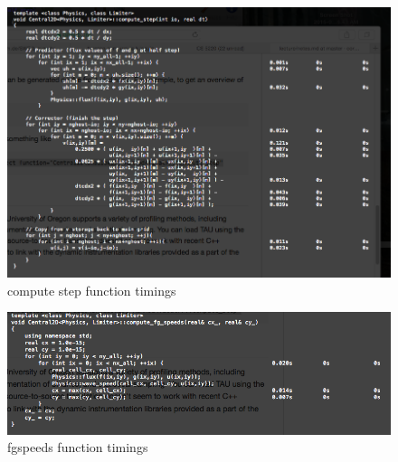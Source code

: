 \documentclass{article}
\begin{document}
 \begin{figure}[here]
  \centering
  \includegraphics[width=0.8\linewidth]{vtune_origcode_computestep.png}
  \caption{compute step function timings}
  \label{fig2}
\end{figure}

\begin{figure}[here]
  \centering
  \includegraphics[width=0.8\linewidth]{compute_fgspeeds_orig_vtune.png}
  \caption{fgspeeds function timings}
  \label{fig3}
\end{figure}
\end{document}
